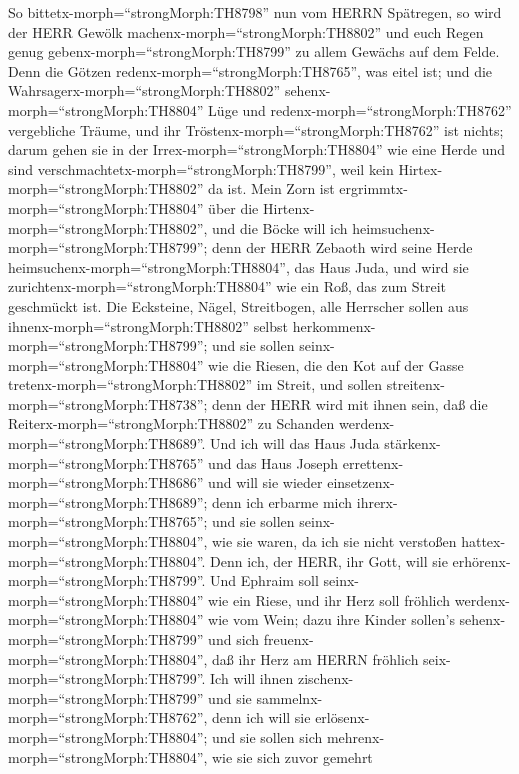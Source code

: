  So bittetx-morph=``strongMorph:TH8798'' nun vom HERRN
Spätregen, so wird der HERR Gewölk machenx-morph=``strongMorph:TH8802''
und euch Regen genug gebenx-morph=``strongMorph:TH8799'' zu allem
Gewächs auf dem Felde.  Denn die Götzen
redenx-morph=``strongMorph:TH8765'', was eitel ist; und die
Wahrsagerx-morph=``strongMorph:TH8802''
sehenx-morph=``strongMorph:TH8804'' Lüge und
redenx-morph=``strongMorph:TH8762'' vergebliche Träume, und ihr
Tröstenx-morph=``strongMorph:TH8762'' ist nichts; darum gehen sie in der
Irrex-morph=``strongMorph:TH8804'' wie eine Herde und sind
verschmachtetx-morph=``strongMorph:TH8799'', weil kein
Hirtex-morph=``strongMorph:TH8802'' da ist.  Mein Zorn ist
ergrimmtx-morph=``strongMorph:TH8804'' über die
Hirtenx-morph=``strongMorph:TH8802'', und die Böcke will ich
heimsuchenx-morph=``strongMorph:TH8799''; denn der HERR Zebaoth wird
seine Herde heimsuchenx-morph=``strongMorph:TH8804'', das Haus Juda, und
wird sie zurichtenx-morph=``strongMorph:TH8804'' wie ein Roß, das zum
Streit geschmückt ist.  Die Ecksteine, Nägel, Streitbogen,
alle Herrscher sollen aus ihnenx-morph=``strongMorph:TH8802'' selbst
herkommenx-morph=``strongMorph:TH8799'';  und sie sollen
seinx-morph=``strongMorph:TH8804'' wie die Riesen, die den Kot auf der
Gasse tretenx-morph=``strongMorph:TH8802'' im Streit, und sollen
streitenx-morph=``strongMorph:TH8738''; denn der HERR wird mit ihnen
sein, daß die Reiterx-morph=``strongMorph:TH8802'' zu Schanden
werdenx-morph=``strongMorph:TH8689''.  Und ich will das Haus
Juda stärkenx-morph=``strongMorph:TH8765'' und das Haus Joseph
errettenx-morph=``strongMorph:TH8686'' und will sie wieder
einsetzenx-morph=``strongMorph:TH8689''; denn ich erbarme mich
ihrerx-morph=``strongMorph:TH8765''; und sie sollen
seinx-morph=``strongMorph:TH8804'', wie sie waren, da ich sie nicht
verstoßen hattex-morph=``strongMorph:TH8804''. Denn ich, der HERR, ihr
Gott, will sie erhörenx-morph=``strongMorph:TH8799''.  Und
Ephraim soll seinx-morph=``strongMorph:TH8804'' wie ein Riese, und ihr
Herz soll fröhlich werdenx-morph=``strongMorph:TH8804'' wie vom Wein;
dazu ihre Kinder sollen's sehenx-morph=``strongMorph:TH8799'' und sich
freuenx-morph=``strongMorph:TH8804'', daß ihr Herz am HERRN fröhlich
seix-morph=``strongMorph:TH8799''.  Ich will ihnen
zischenx-morph=``strongMorph:TH8799'' und sie
sammelnx-morph=``strongMorph:TH8762'', denn ich will sie
erlösenx-morph=``strongMorph:TH8804''; und sie sollen sich
mehrenx-morph=``strongMorph:TH8804'', wie sie sich zuvor gemehrt
